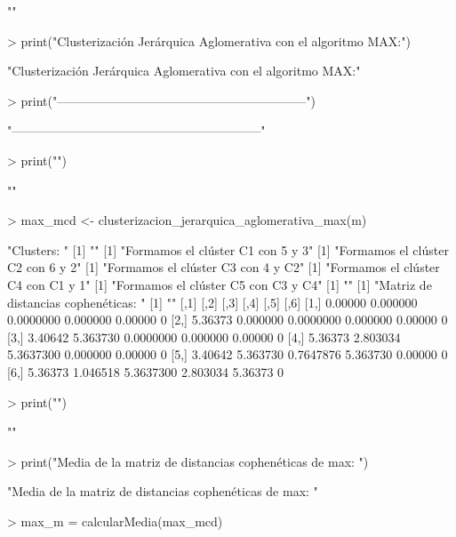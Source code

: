 \documentclass[parskip=full]{scrartcl}
\begin{document}
\begin{Schunk}
\begin{Soutput}
[1] ""
\end{Soutput}
\begin{Sinput}
> print("Clusterización Jerárquica Aglomerativa con el algoritmo MAX:")
\end{Sinput}
\begin{Soutput}
[1] "Clusterización Jerárquica Aglomerativa con el algoritmo MAX:"
\end{Soutput}
\begin{Sinput}
> print("------------------------------------------------------------")
\end{Sinput}
\begin{Soutput}
[1] "------------------------------------------------------------"
\end{Soutput}
\begin{Sinput}
> print("")
\end{Sinput}
\begin{Soutput}
[1] ""
\end{Soutput}
\begin{Sinput}
> max_mcd <- clusterizacion_jerarquica_aglomerativa_max(m)
\end{Sinput}
\begin{Soutput}
[1] "Clusters: "
[1] ""
[1] "Formamos el clúster C1 con 5 y 3"
[1] "Formamos el clúster C2 con 6 y 2"
[1] "Formamos el clúster C3 con 4 y C2"
[1] "Formamos el clúster C4 con C1 y 1"
[1] "Formamos el clúster C5 con C3 y C4"
[1] ""
[1] "Matriz de distancias cophenéticas: "
[1] ""
        [,1]     [,2]      [,3]     [,4]    [,5] [,6]
[1,] 0.00000 0.000000 0.0000000 0.000000 0.00000    0
[2,] 5.36373 0.000000 0.0000000 0.000000 0.00000    0
[3,] 3.40642 5.363730 0.0000000 0.000000 0.00000    0
[4,] 5.36373 2.803034 5.3637300 0.000000 0.00000    0
[5,] 3.40642 5.363730 0.7647876 5.363730 0.00000    0
[6,] 5.36373 1.046518 5.3637300 2.803034 5.36373    0
\end{Soutput}
\begin{Sinput}
> print("")
\end{Sinput}
\begin{Soutput}
[1] ""
\end{Soutput}
\begin{Sinput}
> print("Media de la matriz de distancias cophenéticas de max: ")
\end{Sinput}
\begin{Soutput}
[1] "Media de la matriz de distancias cophenéticas de max: "
\end{Soutput}
\begin{Sinput}
> max_m = calcularMedia(max_mcd)

\end{Sinput}
\end{Schunk}
\end{document}
